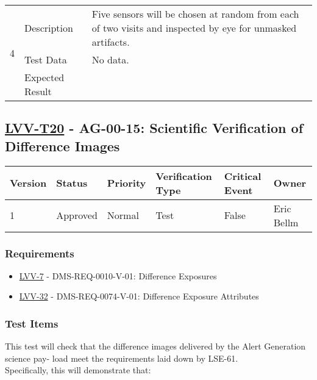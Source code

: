 \begin{longtable}[]{p{1.3cm}p{2cm}p{13cm}}
\multirow{3}{*}{ 4 } & Description &
\begin{minipage}[t]{13cm}{\footnotesize
Five sensors will be chosen at random from each of two visits and
inspected by eye for unmasked artifacts.

\vspace{\dp0}
} \end{minipage} \\ \cline{2-3}
& Test Data &
\begin{minipage}[t]{13cm}{\footnotesize
No data.
\vspace{\dp0}
} \end{minipage} \\ \cline{2-3}
& Expected Result &
\\ \midrule
\end{longtable}

\subsection{\href{https://jira.lsstcorp.org/secure/Tests.jspa\#/testCase/LVV-T20}{LVV-T20}
    - AG-00-15: Scientific Verification of Difference Images}\label{lvv-t20}

\begin{longtable}[]{llllll}
\toprule
Version & Status & Priority & Verification Type & Critical Event & Owner
\\\midrule
1 & Approved & Normal &
Test & False & Eric Bellm
\\\bottomrule
\end{longtable}

\subsubsection{Requirements}
\begin{itemize}
\item \href{https://jira.lsstcorp.org/browse/LVV-7}{LVV-7} - DMS-REQ-0010-V-01: Difference Exposures
\item \href{https://jira.lsstcorp.org/browse/LVV-32}{LVV-32} - DMS-REQ-0074-V-01: Difference Exposure Attributes
\end{itemize}

\subsubsection{Test Items}
This test will check that the difference images delivered by the Alert
Generation science pay- load meet the requirements laid down by
LSE-61.\\
Specifically, this will demonstrate that:

